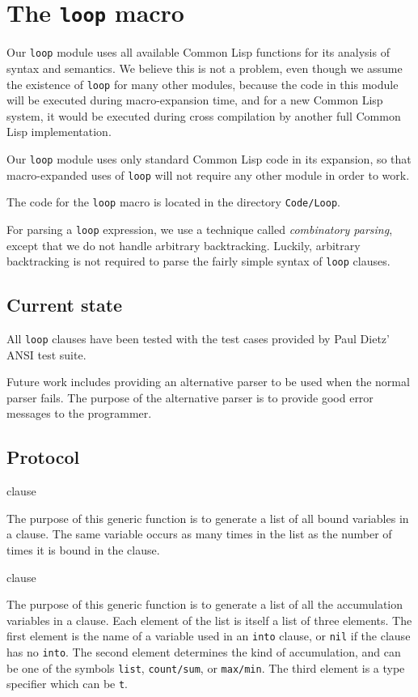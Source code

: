 \chapter{The \texttt{loop} macro} 

Our \texttt{loop} module uses all available Common Lisp functions for
its analysis of syntax and semantics.  We believe this is not a
problem, even though we assume the existence of \texttt{loop} for many
other modules, because the code in this module will be executed during
macro-expansion time, and for a new Common Lisp system, it would be
executed during cross compilation by another full Common Lisp
implementation.

Our \texttt{loop} module uses only standard Common Lisp code in its
expansion, so that macro-expanded uses of \texttt{loop} will not
require any other \sysname{} module in order to work.

The code for the \sysname{} \texttt{loop} macro is located in the
directory \texttt{Code/Loop}.  

For parsing a \texttt{loop} expression, we use a technique called
\emph{combinatory parsing}, except that we do not handle arbitrary
backtracking.  Luckily, arbitrary backtracking is not required to
parse the fairly simple syntax of \texttt{loop} clauses.

\section{Current state}

All \texttt{loop} clauses have been tested with the test cases
provided by Paul Dietz' ANSI \commonlisp{} test suite.

Future work includes providing an alternative parser to be used when
the normal parser fails.  The purpose of the alternative parser is to
provide good error messages to the programmer.

\section{Protocol}

 {clause}

The purpose of this generic function is to generate a list of all
bound variables in a clause.  The same variable occurs as many times
in the list as the number of times it is bound in the clause.

 {clause}

The purpose of this generic function is to generate a list of all the
accumulation variables in a clause.  Each element of the list is
itself a list of three elements.  The first element is the name of a
variable used in an \texttt{into} clause, or \texttt{nil} if the
clause has no \texttt{into}.  The second element determines the kind
of accumulation, and can be one of the symbols \texttt{list},
\texttt{count/sum}, or \texttt{max/min}.  The third element is a type
specifier which can be \texttt{t}.
